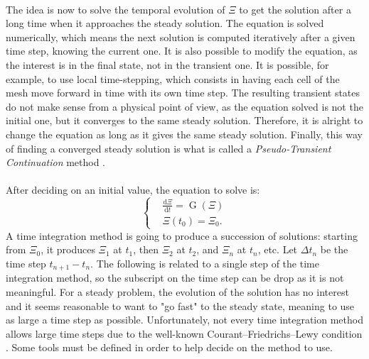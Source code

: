     \paragraph{}
    The idea is now to solve the temporal evolution of $\Xi$ to get the solution after a long time when it approaches the steady solution.
    The equation is solved numerically, which means the next solution is computed iteratively after a given time step, knowing the current one.
    It is also possible to modify the equation, as the interest is in the final state, not in the transient one.
    It is possible, for example, to use local time-stepping, which consists in having each cell of the mesh move forward in time with its own time step.
    The resulting transient states do not make sense from a physical point of view, as the equation solved is not the initial one, but it converges to the same steady solution.
    Therefore, it is alright to change the equation as long as it gives the same steady solution.
    Finally, this way of finding a converged steady solution is what is called a \emph{Pseudo-Transient Continuation} method \cite{KelleyKeyes1996}.

    \paragraph{}
    After deciding on an initial value, the equation to solve is:
    \begin{equation}\label{eq:init_value_ode}
      \left\{\begin{aligned}
        & \frac{\mathrm{d} \Xi}{\mathrm{d}t} = \operatorname{G}\left(\Xi\right) \\
        & \Xi\left(t_0\right) = \Xi_0 .
      \end{aligned}\right.
    \end{equation}
    A time integration method is going to produce a succession of solutions: starting from $\Xi_0$, it produces $\Xi_1$ at $t_1$, then $\Xi_2$ at $t_2$, and $\Xi_n$ at $t_n$, etc.
    Let $\Delta t_n$ be the time step $t_{n+1} - t_n$.
    The following is related to a single step of the time integration method, so the subscript on the time step can be drop as it is not meaningful.
    For a steady problem, the evolution of the solution has no interest and it seems reasonable to want to "go fast" to the steady state, meaning to use as large a time step as possible.
    Unfortunately, not every time integration method allows large time steps due to the well-known Courant--Friedrichs--Lewy condition \cite{CourantFriedrichsLewy1967}.
    Some tools must be defined in order to help decide on the method to use.


